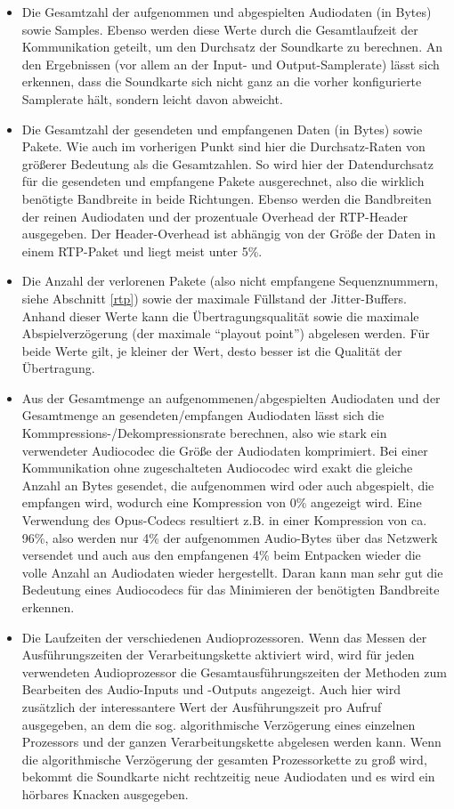 \begin{itemize}
\item Die Gesamtzahl der aufgenommen und abgespielten Audiodaten (in Bytes) sowie Samples. Ebenso werden diese Werte durch die Gesamtlaufzeit der Kommunikation geteilt, um den Durchsatz der Soundkarte zu berechnen. An den Ergebnissen (vor allem an der Input- und Output-Samplerate) lässt sich erkennen, dass die Soundkarte sich nicht ganz an die vorher konfigurierte Samplerate hält, sondern leicht davon abweicht.
\item Die Gesamtzahl der gesendeten und empfangenen Daten (in Bytes) sowie Pakete. Wie auch im vorherigen Punkt sind hier die Durchsatz-Raten von größerer Bedeutung als die Gesamtzahlen. So wird hier der Datendurchsatz für die gesendeten und empfangene Pakete ausgerechnet, also die wirklich benötigte Bandbreite in beide Richtungen. Ebenso werden die Bandbreiten der reinen Audiodaten und der prozentuale Overhead der RTP-Header ausgegeben. Der Header-Overhead ist abhängig von der Größe der Daten in einem RTP-Paket und liegt meist unter 5\%.
\item Die Anzahl der verlorenen Pakete (also nicht empfangene Sequenznummern, siehe Abschnitt \ref{rtp}) sowie der maximale Füllstand der Jitter-Buffers. Anhand dieser Werte kann die Übertragungsqualität sowie die maximale Abspielverzögerung (der maximale \enquote{playout point}) abgelesen werden. Für beide Werte gilt, je kleiner der Wert, desto besser ist die Qualität der Übertragung.
\item Aus der Gesamtmenge an aufgenommenen/abgespielten Audiodaten und der Gesamtmenge an gesendeten/empfangen Audiodaten lässt sich die Kommpres\-sions-/Dekompressionsrate berechnen, also wie stark ein verwendeter Audiocodec die Größe der Audiodaten komprimiert. Bei einer Kommunikation ohne zugeschalteten Audiocodec wird exakt die gleiche Anzahl an Bytes gesendet, die aufgenommen wird oder auch abgespielt, die empfangen wird, wodurch eine Kompression von 0\% angezeigt wird. Eine Verwendung des Opus-Codecs resultiert z.B. in einer Kompression von ca. 96\%, also werden nur 4\% der aufgenommen Audio-Bytes über das Netzwerk versendet und auch aus den empfangenen 4\% beim Entpacken wieder die volle Anzahl an Audiodaten wieder hergestellt. Daran kann man sehr gut die Bedeutung eines Audiocodecs für das Minimieren der benötigten Bandbreite erkennen.
\item Die Laufzeiten der verschiedenen Audioprozessoren. Wenn das Messen der Ausführungszeiten der Verarbeitungskette aktiviert wird, wird für jeden verwendeten Audioprozessor die Gesamtausführungszeiten der Methoden zum Bearbeiten des Audio-Inputs und -Outputs angezeigt. Auch hier wird zusätzlich der interessantere Wert der Ausführungszeit pro Aufruf ausgegeben, an dem die sog. algorithmische Verzögerung eines einzelnen Prozessors und der ganzen Verarbeitungskette abgelesen werden kann. Wenn die algorithmische Verzögerung der gesamten Prozessorkette zu groß wird, bekommt die Soundkarte nicht rechtzeitig neue Audiodaten und es wird ein hörbares Knacken ausgegeben.
\end{itemize}
